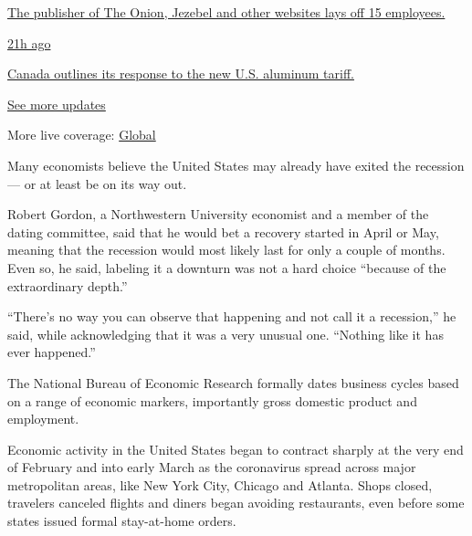 \href{https://www.nytimes.com/live/2020/08/07/business/stock-market-today-coronavirus?action=click\&pgtype=Article\&state=default\&region=MAIN_CONTENT_1\&context=storylines_live_updates\#the-publisher-of-the-onion-jezebel-and-other-websites-lays-off-15-employees}{The
publisher of The Onion, Jezebel and other websites lays off 15
employees.}

\href{https://www.nytimes.com/live/2020/08/07/business/stock-market-today-coronavirus?action=click\&pgtype=Article\&state=default\&region=MAIN_CONTENT_1\&context=storylines_live_updates\#canada-outlines-its-response-to-the-new-us-aluminum-tariff}{21h
ago}

\href{https://www.nytimes.com/live/2020/08/07/business/stock-market-today-coronavirus?action=click\&pgtype=Article\&state=default\&region=MAIN_CONTENT_1\&context=storylines_live_updates\#canada-outlines-its-response-to-the-new-us-aluminum-tariff}{Canada
outlines its response to the new U.S. aluminum tariff.}

\href{https://www.nytimes.com/live/2020/08/07/business/stock-market-today-coronavirus?action=click\&pgtype=Article\&state=default\&region=MAIN_CONTENT_1\&context=storylines_live_updates}{See
more updates}

More live coverage:
\href{https://www.nytimes.com/2020/08/07/world/covid-19-news.html?action=click\&pgtype=Article\&state=default\&region=MAIN_CONTENT_1\&context=storylines_live_updates}{Global}

Many economists believe the United States may already have exited the
recession --- or at least be on its way out.

Robert Gordon, a Northwestern University economist and a member of the
dating committee, said that he would bet a recovery started in April or
May, meaning that the recession would most likely last for only a couple
of months. Even so, he said, labeling it a downturn was not a hard
choice ``because of the extraordinary depth.''

``There's no way you can observe that happening and not call it a
recession,'' he said, while acknowledging that it was a very unusual
one. ``Nothing like it has ever happened.''

The National Bureau of Economic Research formally dates business cycles
based on a range of economic markers, importantly gross domestic product
and employment.

Economic activity in the United States began to contract sharply at the
very end of February and into early March as the coronavirus spread
across major metropolitan areas, like New York City, Chicago and
Atlanta. Shops closed, travelers canceled flights and diners began
avoiding restaurants, even before some states issued formal stay-at-home
orders.

